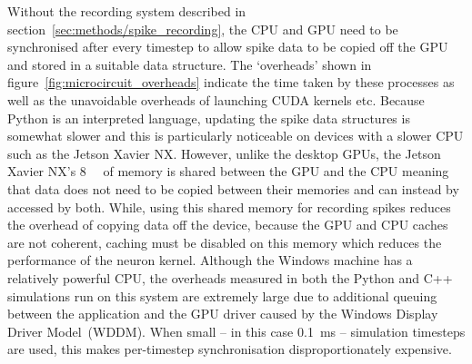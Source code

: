 \documentclass[utf8]{frontiersSCNS} %
\begin{document}
Without the recording system described in section~\ref{sec:methods/spike_recording}, the CPU and GPU need to be synchronised after every timestep to allow spike data to be copied off the GPU and stored in a suitable data structure.
The `overheads' shown in figure~\ref{fig:microcircuit_overheads} indicate the time taken by these processes as well as the unavoidable overheads of launching CUDA kernels etc.
Because Python is an interpreted language, updating the spike data structures is somewhat slower and this is particularly noticeable on devices with a slower CPU such as the Jetson Xavier NX.
However, unlike the desktop GPUs, the Jetson Xavier NX's \SI{8}{\giga\byte} of memory is shared between the GPU and the CPU meaning that data does not need to be copied between their memories and can instead by accessed by both.
While, using this shared memory for recording spikes reduces the overhead of copying data off the device, because the GPU and CPU caches are not coherent, caching must be disabled on this memory which reduces the performance of the neuron kernel.
Although the Windows machine has a relatively powerful CPU, the overheads measured in both the Python and C++ simulations run on this system are extremely large due to additional queuing between the application and the GPU driver  caused by the Windows Display Driver Model~(WDDM).
When small -- in this case \SI{0.1}{\milli\second} -- simulation timesteps are used, this makes per-timestep synchronisation disproportionately expensive.
\end{document}
